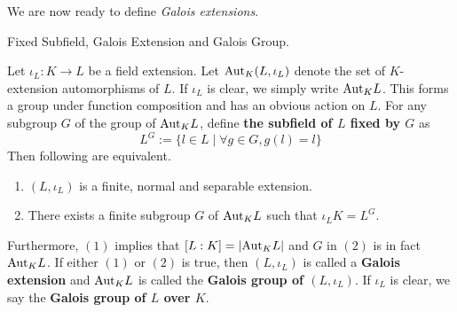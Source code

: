 \documentclass[../book.tex]{subfiles}
\begin{document}
We are now ready to define \emph{Galois extensions}. 

\begin{dfn} Fixed Subfield, Galois Extension and Galois Group.

    Let $\iota_L : K \to L$ be a field extension.
    Let $\mathrm{Aut}_{K}(L,\iota_L)$ denote the set of $K$-extension automorphisms of $L$.
    If $\iota_L$ is clear, we simply write $\mathrm{Aut}_{K}L$. 
    This forms a group under function composition and has an obvious action on $L$. 
    For any subgroup $G$ of the group of $\mathrm{Aut}_{K}L$, 
    define \textbf{the subfield of $L$ fixed by $G$} as
    \[ L^G := \{l \in L \mid \forall g \in G, g(l)=l\} \]
    Then following are equivalent.
    \begin{enumerate}
        \item $(L,\iota_L)$ is a finite, normal and separable extension.
        \item There exists a finite subgroup $G$ of $\mathrm{Aut}_{K}L$ such that
        $\iota_L K = L^G$. 
    \end{enumerate} 
    Furthermore, $(1)$ implies that $[L : K] = |\mathrm{Aut}_{K}L|$ 
    and $G$ in $(2)$ is in fact $\mathrm{Aut}_{K}L$.
    If either $(1)$ or $(2)$ is true,
    then $(L,\iota_L)$ is called a \textbf{Galois extension} and
    $\mathrm{Aut}_{K}L$ is called the \textbf{Galois group of $(L,\iota_L)$}.
    If $\iota_L$ is clear, we say the \textbf{Galois group of $L$ over $K$}. 
\end{dfn}
\end{document}
